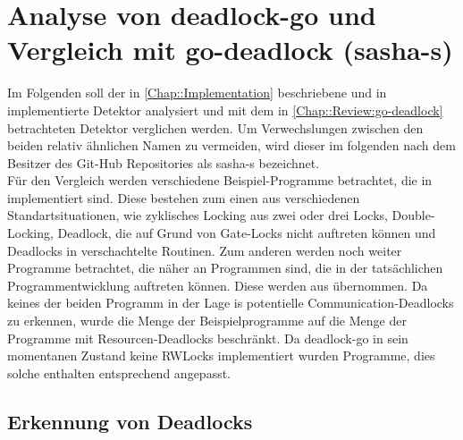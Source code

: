 \chapter{Analyse von deadlock-go und Vergleich mit 
    go-deadlock (sasha-s)}
Im Folgenden soll der in \ref{Chap::Implementation} beschriebene und in 
\cite{implementation} implementierte Detektor analysiert und mit dem in 
\ref{Chap::Review:go-deadlock} betrachteten Detektor verglichen
werden. Um Verwechslungen zwischen den beiden relativ ähnlichen Namen zu vermeiden,
wird dieser im folgenden nach dem Besitzer des Git-Hub Repositories als sasha-s
bezeichnet.\\
Für den Vergleich werden verschiedene Beispiel-Programme betrachtet, die in 
\cite{examples} implementiert sind. Diese bestehen zum einen aus verschiedenen 
Standartsituationen, wie zyklisches Locking aus zwei oder drei Locks, 
Double-Locking, Deadlock, die auf 
Grund von Gate-Locks nicht auftreten können und Deadlocks in verschachtelte Routinen. 
Zum anderen werden noch weiter 
Programme betrachtet, die näher an Programmen sind, die in der tatsächlichen 
Programmentwicklung auftreten können. Diese werden aus \cite{gobench} übernommen.
Da keines der beiden Programm in der Lage is potentielle Communication-Deadlocks
zu erkennen, wurde die Menge der Beispielprogramme auf die Menge der Programme 
mit Resourcen-Deadlocks beschränkt. Da deadlock-go in sein momentanen Zustand 
keine RWLocks implementiert wurden Programme, dies solche enthalten entsprechend
angepasst.
\section{Erkennung von Deadlocks}

